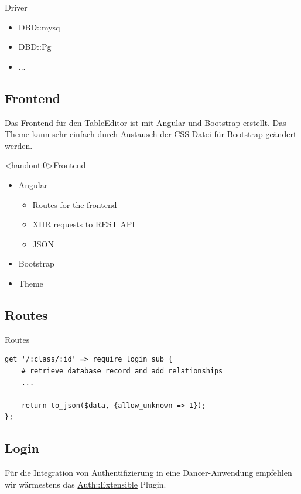 \begin{frame}[fragile]{Driver}
\begin{itemize}
\item DBD::mysql
\item DBD::Pg
\item ...
\end{itemize}
\end{frame}

\subsection{Frontend}
Das Frontend für den TableEditor ist mit Angular und Bootstrap erstellt.
Das Theme kann sehr einfach durch Austausch der CSS-Datei für Bootstrap
geändert werden.

\begin{frame}<handout:0>{Frontend}
\begin{itemize}
\item Angular
\begin{itemize}
\item Routes for the frontend
\item XHR requests to REST API
\item JSON
\end{itemize}
\item Bootstrap
\item Theme
\end{itemize}
\end{frame}

\subsection{Routes}
\begin{frame}[fragile]{Routes}
\begin{lstlisting}
get '/:class/:id' => require_login sub {
    # retrieve database record and add relationships
    ...

    return to_json($data, {allow_unknown => 1});
};
\end{lstlisting}
\end{frame}

\subsection{Login}

Für die Integration von Authentifizierung in eine Dancer-Anwendung empfehlen
wir wärmestens das
\href{https://metacpan.org/pod/Dancer::Plugin::Auth::Extensible}{Auth::Extensible}
Plugin.

